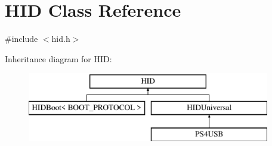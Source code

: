\hypertarget{class_h_i_d}{\section{\-H\-I\-D \-Class \-Reference}
\label{class_h_i_d}
}


{\ttfamily \#include $<$hid.\-h$>$}

\-Inheritance diagram for \-H\-I\-D\-:\begin{figure}[H]
\begin{center}
\leavevmode
\includegraphics[height=3.000000cm]{class_h_i_d}
\end{center}
\end{figure}
